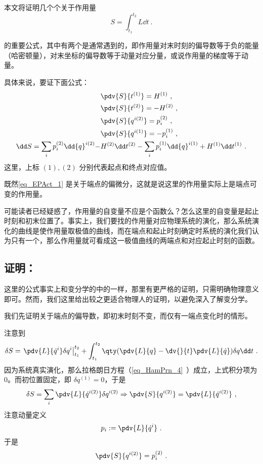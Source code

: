 
本文将证明几个个关于作用量
\begin{equation}
S=\int_{t_1}^{t_2}L\dd t~.
\end{equation}

的重要公式，其中有两个是通常遇到的，即作用量对末时刻的偏导数等于负的能量（哈密顿量），对末坐标的偏导数等于动量对应分量，或说作用量的梯度等于动量。

具体来说，要证下面公式：
\begin{equation}\label{eq_EPAct_1}
\begin{aligned}
&\pdv{S}{t^{(1)}}=H^{(1)}~,\\
&\pdv{S}{t^{(2)}}=-H^{(2)}~,\\
&\pdv{S}{{q}^{i(2)}}=p_i^{(2)}~,\\
&\pdv{S}{{q}^{i (1)}}=-p_i^{(1)}~,\\
\dd S=\sum_i p_i^{(2)}\dd {q}^{i (2)}-&H^{(2)}\dd t^{(2)}-\sum_i p_i^{(1)}\dd {q}^{i (1)}+H^{(1)}\dd t^{(1)}~.
\end{aligned}
\end{equation}
这里，上标 $(1),(2)$ 分别代表起点和终点对应值。

既然\autoref{eq_EPAct_1} 是关于端点的偏微分，这就是说这里的作用量实际上是端点可变的作用量。

可能读者已经疑惑了，作用量的自变量不应是个函数么？怎么这里的自变量是起止时刻和初末位置了。事实上，我们要找的作用量对应物理系统的演化，那么系统演化的曲线是使作用量取极值的曲线，而在端点和起止时刻确定时系统的演化我们认为只有一个，那么作用量就可看成这一极值曲线的两端点和对应起止时刻的函数。
\subsection{证明：}
这里的公式事实上和变分学的中的一样，那里有更严格的证明，只需明确物理意义即可。然而，我们这里给出较之更适合物理人的证明，以避免深入了解变分学。

我们先证明关于端点的偏导数，即初末时刻不变，而仅有一端点变化时的情形。

注意到
\begin{equation}
\delta S=\left.\pdv{L}{\dot q^i}\delta q^i\right|_{t_1}^{t_2}+\int_{t_1}^{t_2}\qty(\pdv{L}{q}-\dv{}{t}\pdv{L}{\dot q})\delta q\dd t~.
\end{equation}
因为系统真实演化，那么拉格朗日方程（\autoref{eq_HamPrn_4}~）成立，上式积分项为0。而初位置固定，即 $\delta q^{(1)}=0$，于是
\begin{equation}
\delta S=\sum_i\pdv{L}{{\dot q}^{i (2)}}\delta {q}^{i (2)}\Rightarrow \pdv{S}{{q}^{i (2)}}=\pdv{L}{{\dot q}^{i (2)}}~,
\end{equation}
注意动量定义
\begin{equation}
p_i:=\pdv{L}{\dot q^i}~.
\end{equation}
于是
\begin{equation}
\pdv{S}{{q}^{i (2)}}=p_i^{(2)}~.
\end{equation}


